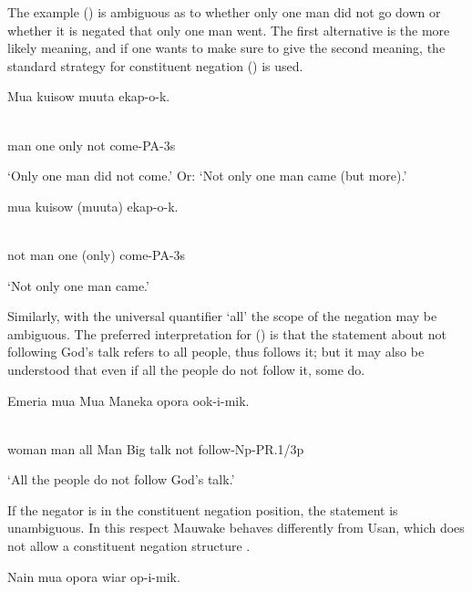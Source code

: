 The example () is ambiguous as to whether only one man did not go down or whether it is negated that only one man went. The first alternative is the more likely meaning, and if one wants to make sure to give the second meaning, the standard strategy for constituent negation () is used.

\ea%
\label{ex:x1145}
\gll Mua  kuisow  muuta    ekap-o-k. \\
      \\
\glt
\z

man  one  only  not  come-PA-3s

`Only one man did not come.' Or: `Not only one man came (but more).'

\ea%
\label{ex:x1144}
\gll {}  mua  kuisow  (muuta)  ekap-o-k. \\
      \\
\glt
\z

not  man  one  (only)  come-PA-3s

`Not only one man came.'

Similarly, with the universal quantifier  `all' the scope of the negation may be ambiguous. The preferred interpretation for () is that the statement about not following God's talk refers to all people, thus  follows it; but it may also be understood that even if all the people do not follow it, some do.

\ea%
\label{ex:x1148}
\gll Emeria  mua    Mua  Maneka  opora    ook-i-mik. \\
      \\
\glt
\z

woman  man  all  Man  Big  talk  not  follow-Np-PR.1/3p

`All the people do not follow God's talk.'

If the negator is in the constituent negation position, the statement is unambiguous. In this respect Mauwake behaves differently from Usan, which does not allow a constituent negation structure \citep[275-277]{Reesink1987}.

\ea%
\label{ex:x1149}
\gll Nain    mua    opora  wiar  op-i-mik. \\
      \\
\glt
\z

